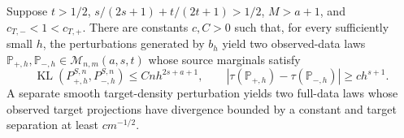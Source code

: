 Suppose \(t>1/2\), \(s/(2s+1)+t/(2t+1)>1/2\), \(M>a+1\), and \(c_{T,-}<1<c_{T,+}\). There are constants \(c,C>0\) such that, for every sufficiently small \(h\), the perturbations generated by \(b_h\) yield two observed-data laws \(\mathbb P_{+,h},\mathbb P_{-,h}\in\mathcal M_{n,m}(a,s,t)\) whose source marginals satisfy \[\operatorname{KL}(P_{+,h}^{S,n},P_{-,h}^{S,n})\le Cnh^{2s+a+1},\qquad |\tau(\mathbb P_{+,h})-\tau(\mathbb P_{-,h})|\ge ch^{s+1}.\] A separate smooth target-density perturbation yields two full-data laws whose observed target projections have divergence bounded by a constant and target separation at least \(cm^{-1/2}\).